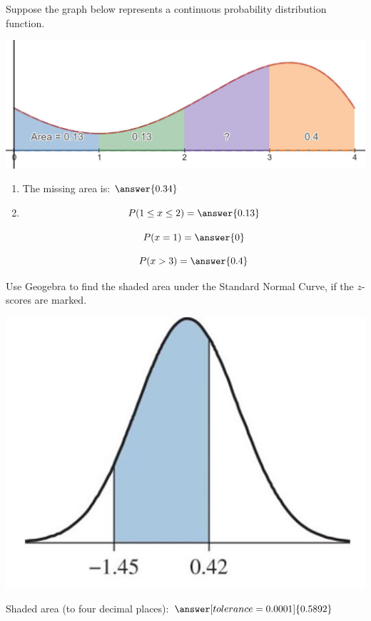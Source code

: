 \documentclass{ximera}
\begin{document}
\begin{problem}\label{prob:exam2prob2}
Suppose the graph below represents a continuous probability distribution function.
\begin{image}
\includegraphics{test2pic3.jpg}
\end{image}
  \begin{enumerate}
      \item The missing area is: $\answer{0.34}$
      \item 
      
          $$P(1\leq x\leq 2)=\answer{0.13}$$
  
          $$P(x=1)=\answer{0}$$
   
          $$P(x>3)=\answer{0.4}$$
    
     
  \end{enumerate}
\end{problem}

\begin{problem}\label{prob:exam2prob3}
Use Geogebra to find the shaded area under the Standard Normal Curve, if the $z$-scores are marked. \begin{image}
\includegraphics{test2pic2.jpg}
\end{image}

Shaded area (to four decimal places): $\answer[tolerance=0.0001]{0.5892}$
\end{problem}
\end{document}
